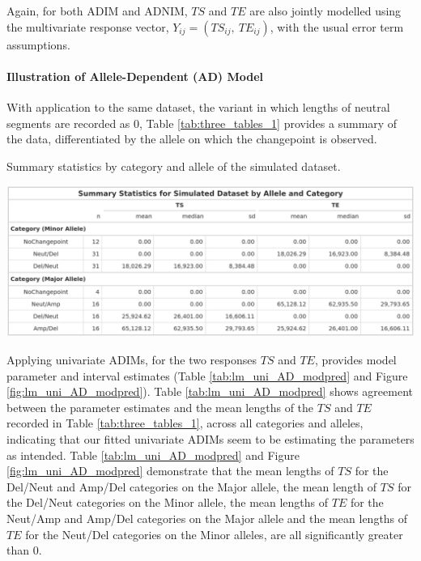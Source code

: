 Again, for both ADIM and ADNIM, $TS$ and $TE$ are also jointly modelled using the multivariate response vector, $Y_{ij}=(TS_{ij},\:TE_{ij})$, with the usual error term assumptions.

\paragraph{Illustration of Allele-Dependent (AD) Model}
\hfill
\newline

\noindent With application to the same dataset, the variant in which lengths of neutral segments are recorded as 0, Table \ref{tab:three_tables_1} provides a summary of the data, differentiated by the allele on which the changepoint is observed.

\begin{table}[H]
\caption[Summary statistics by category and allele of the simulated dataset.]{Summary statistics by category and allele of the simulated dataset.} 
\centering
\includegraphics[width = 1\textwidth]{../tables/Chapter_5/Indv_Simulated_Example_Allele_Summary_Table.png}
\label{tab:three_tables_1}
\end{table}

Applying univariate ADIMs, for the two responses $TS$ and $TE$, provides model parameter and interval estimates (Table \ref{tab:lm_uni_AD_modpred} and Figure \ref{fig:lm_uni_AD_modpred}). Table \ref{tab:lm_uni_AD_modpred} shows agreement between the parameter estimates and the mean lengths of the $TS$ and $TE$ recorded in Table \ref{tab:three_tables_1}, across all categories and alleles, indicating that our fitted univariate ADIMs seem to be estimating the parameters as intended. Table \ref{tab:lm_uni_AD_modpred} and Figure \ref{fig:lm_uni_AD_modpred} demonstrate that the mean lengths of $TS$ for the Del/Neut and Amp/Del categories on the Major allele, the mean length of $TS$ for the Del/Neut categories on the Minor allele, the mean lengths of $TE$ for the Neut/Amp and Amp/Del categories on the Major allele and the mean lengths of $TE$ for the Neut/Del categories on the Minor alleles, are all significantly greater than 0. 

